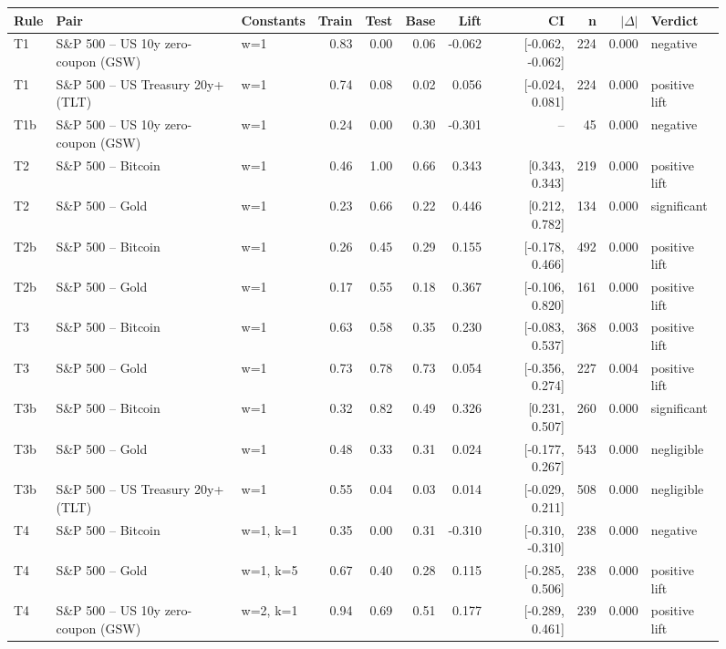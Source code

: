\begin{figure}
\centering
\begin{tabular}{lllrrrrrrrl}
\toprule
Rule & Pair & Constants & Train & Test & Base & Lift & CI & n & $|\Delta|$ & Verdict \\
\midrule
T1 & S\&P 500 -- US 10y zero-coupon (GSW) & w=1 & 0.83 & 0.00 & 0.06 & -0.062 & [-0.062, -0.062] & 224 & 0.000 & negative \\
T1 & S\&P 500 -- US Treasury 20y+ (TLT) & w=1 & 0.74 & 0.08 & 0.02 & 0.056 & [-0.024, 0.081] & 224 & 0.000 & positive lift \\
T1b & S\&P 500 -- US 10y zero-coupon (GSW) & w=1 & 0.24 & 0.00 & 0.30 & -0.301 & -- & 45 & 0.000 & negative \\
T2 & S\&P 500 -- Bitcoin & w=1 & 0.46 & 1.00 & 0.66 & 0.343 & [0.343, 0.343] & 219 & 0.000 & positive lift \\
T2 & S\&P 500 -- Gold & w=1 & 0.23 & 0.66 & 0.22 & 0.446 & [0.212, 0.782] & 134 & 0.000 & significant \\
T2b & S\&P 500 -- Bitcoin & w=1 & 0.26 & 0.45 & 0.29 & 0.155 & [-0.178, 0.466] & 492 & 0.000 & positive lift \\
T2b & S\&P 500 -- Gold & w=1 & 0.17 & 0.55 & 0.18 & 0.367 & [-0.106, 0.820] & 161 & 0.000 & positive lift \\
T3 & S\&P 500 -- Bitcoin & w=1 & 0.63 & 0.58 & 0.35 & 0.230 & [-0.083, 0.537] & 368 & 0.003 & positive lift \\
T3 & S\&P 500 -- Gold & w=1 & 0.73 & 0.78 & 0.73 & 0.054 & [-0.356, 0.274] & 227 & 0.004 & positive lift \\
T3b & S\&P 500 -- Bitcoin & w=1 & 0.32 & 0.82 & 0.49 & 0.326 & [0.231, 0.507] & 260 & 0.000 & significant \\
T3b & S\&P 500 -- Gold & w=1 & 0.48 & 0.33 & 0.31 & 0.024 & [-0.177, 0.267] & 543 & 0.000 & negligible \\
T3b & S\&P 500 -- US Treasury 20y+ (TLT) & w=1 & 0.55 & 0.04 & 0.03 & 0.014 & [-0.029, 0.211] & 508 & 0.000 & negligible \\
T4 & S\&P 500 -- Bitcoin & w=1, k=1 & 0.35 & 0.00 & 0.31 & -0.310 & [-0.310, -0.310] & 238 & 0.000 & negative \\
T4 & S\&P 500 -- Gold & w=1, k=5 & 0.67 & 0.40 & 0.28 & 0.115 & [-0.285, 0.506] & 238 & 0.000 & positive lift \\
T4 & S\&P 500 -- US 10y zero-coupon (GSW) & w=2, k=1 & 0.94 & 0.69 & 0.51 & 0.177 & [-0.289, 0.461] & 239 & 0.000 & positive lift \\

\end{tabular}
\end{figure}
